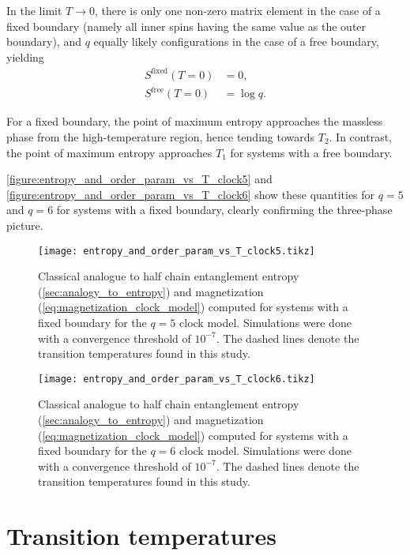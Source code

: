In the limit $T \to 0$, there is only one non-zero matrix element in the case of a fixed boundary (namely all inner
spins having the same value as the outer boundary), and $q$ equally likely configurations in the case of a free
boundary, yielding
\begin{align*}
  S^{\text{fixed}}(T = 0) &= 0, \\
  S^{\text{free}}(T = 0)  &= \log q.
\end{align*}

For a fixed boundary, the point of maximum entropy approaches the massless phase from the high-temperature region,
hence tending towards $T_2$.
In contrast, the point of maximum entropy approaches $T_1$ for systems with a free boundary.

\autoref{figure:entropy_and_order_param_vs_T_clock5} and \autoref{figure:entropy_and_order_param_vs_T_clock6} show
these quantities for $q = 5$ and $q = 6$ for systems with a fixed boundary, clearly confirming the three-phase picture.

\begin{figure}
  \texttt{[image: entropy\_and\_order\_param\_vs\_T\_clock5.tikz]}
  \caption{Classical analogue to half chain entanglement entropy (\autoref{sec:analogy_to_entropy}) and magnetization
  (\autoref{eq:magnetization_clock_model}) computed for systems with a fixed boundary for the $q = 5$ clock model.
  Simulations were done with a convergence threshold of $10^{-7}$. The dashed lines denote the transition temperatures found in this study.}\label{figure:entropy_and_order_param_vs_T_clock5}
\end{figure}

\begin{figure}
  \texttt{[image: entropy\_and\_order\_param\_vs\_T\_clock6.tikz]}
  \caption{Classical analogue to half chain entanglement entropy (\autoref{sec:analogy_to_entropy}) and magnetization
  (\autoref{eq:magnetization_clock_model}) computed for systems with a fixed boundary for the $q = 6$ clock model.
  Simulations were done with a convergence threshold of $10^{-7}$. The dashed lines denote the transition temperatures found in this study.}\label{figure:entropy_and_order_param_vs_T_clock6}
\end{figure}

\section{Transition temperatures}

